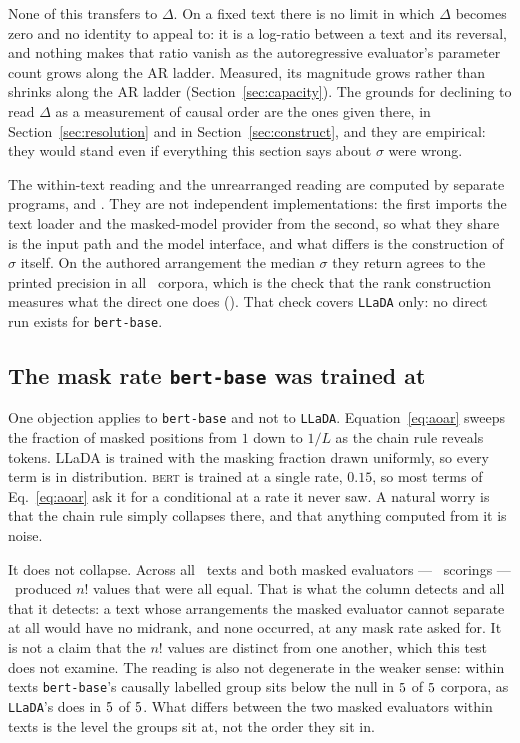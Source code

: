 None of this transfers to $\Delta$.  On a fixed text there is no limit in
which $\Delta$ becomes zero and no identity to appeal to: it is a
log-ratio between a text
and its reversal, and nothing makes that ratio vanish as the autoregressive
evaluator's parameter count grows along the AR ladder.  Measured, its magnitude grows rather than shrinks along the AR ladder
(Section~\ref{sec:capacity}).  The grounds for declining to read $\Delta$ as
a measurement of causal order are the ones given there, in
Section~\ref{sec:resolution} and in Section~\ref{sec:construct}, and they
are empirical: they would stand even if everything this section says about
$\sigma$ were wrong.

The within-text reading and the unrearranged reading are computed by
separate programs,  and
.  They are not independent implementations: the
first imports the text loader and the masked-model provider from the second,
so what they share is the input path and the model interface, and what
differs is the construction of $\sigma$ itself.  On the authored
arrangement the median $\sigma$ they return agrees to the printed precision
in all \FbNCorpora\ corpora, which is the check that the rank construction
measures what the direct one does ().  That
check covers \texttt{LLaDA} only: no direct run exists for
\texttt{bert-base}.

\subsection{The mask rate \texttt{bert-base} was trained at}
\label{sec:maskrate}

One objection applies to \texttt{bert-base} and not to \texttt{LLaDA}.
Equation~\eqref{eq:aoar} sweeps the fraction of masked positions from $1$
down to $1/L$ as the chain rule reveals tokens.  LLaDA is trained with the
masking fraction drawn uniformly, so every term is in distribution.
\textsc{bert} is trained at a single rate, $0.15$, so most terms of
Eq.~\eqref{eq:aoar} ask it for a conditional at a rate it never saw.  A
natural worry is that the chain rule simply collapses there, and that
anything computed from it is noise.

It does not collapse.  Across all \FbNTexts\ texts and both masked evaluators ---
\FbNScorings\ scorings --- \FbDegenTotal\ produced $n!$ values that were
all equal.  That is what the column detects and all that it detects: a text
whose arrangements the masked evaluator cannot separate at all would have no
midrank, and none occurred, at any mask rate asked for.  It is not a claim
that the $n!$ values are distinct from one another, which this test does not
examine.  The reading is also not degenerate in the weaker
sense: within texts \texttt{bert-base}'s causally labelled group
sits below the null in $5$ of
$5$ corpora, as \texttt{LLaDA}'s does in
$5$ of $5$.  What differs between the two
masked evaluators within texts is the level the groups sit at, not the order
they sit in.

